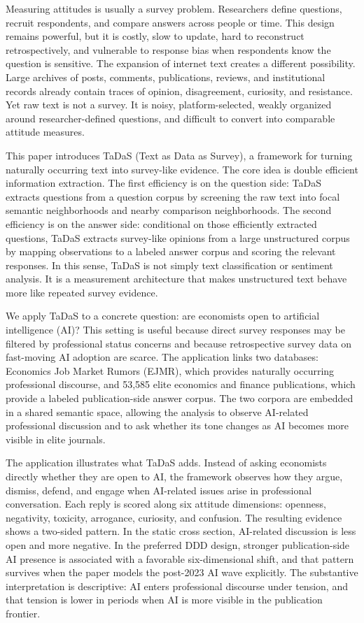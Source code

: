 \documentclass[11pt]{article}
\begin{document}
Measuring attitudes is usually a survey problem. Researchers define questions, recruit respondents, and compare answers across people or time. This design remains powerful, but it is costly, slow to update, hard to reconstruct retrospectively, and vulnerable to response bias when respondents know the question is sensitive. The expansion of internet text creates a different possibility. Large archives of posts, comments, publications, reviews, and institutional records already contain traces of opinion, disagreement, curiosity, and resistance. Yet raw text is not a survey. It is noisy, platform-selected, weakly organized around researcher-defined questions, and difficult to convert into comparable attitude measures.

This paper introduces TaDaS (Text as Data as Survey), a framework for turning naturally occurring text into survey-like evidence. The core idea is double efficient information extraction. The first efficiency is on the question side: TaDaS extracts questions from a question corpus by screening the raw text into focal semantic neighborhoods and nearby comparison neighborhoods. The second efficiency is on the answer side: conditional on those efficiently extracted questions, TaDaS extracts survey-like opinions from a large unstructured corpus by mapping observations to a labeled answer corpus and scoring the relevant responses. In this sense, TaDaS is not simply text classification or sentiment analysis. It is a measurement architecture that makes unstructured text behave more like repeated survey evidence.

We apply TaDaS to a concrete question: are economists open to artificial intelligence (AI)? This setting is useful because direct survey responses may be filtered by professional status concerns and because retrospective survey data on fast-moving AI adoption are scarce. The application links two databases: Economics Job Market Rumors (EJMR), which provides naturally occurring professional discourse, and 53,585 elite economics and finance publications, which provide a labeled publication-side answer corpus. The two corpora are embedded in a shared semantic space, allowing the analysis to observe AI-related professional discussion and to ask whether its tone changes as AI becomes more visible in elite journals.

The application illustrates what TaDaS adds. Instead of asking economists directly whether they are open to AI, the framework observes how they argue, dismiss, defend, and engage when AI-related issues arise in professional conversation. Each reply is scored along six attitude dimensions: openness, negativity, toxicity, arrogance, curiosity, and confusion. The resulting evidence shows a two-sided pattern. In the static cross section, AI-related discussion is less open and more negative. In the preferred DDD design, stronger publication-side AI presence is associated with a favorable six-dimensional shift, and that pattern survives when the paper models the post-2023 AI wave explicitly. The substantive interpretation is descriptive: AI enters professional discourse under tension, and that tension is lower in periods when AI is more visible in the publication frontier.
\end{document}
